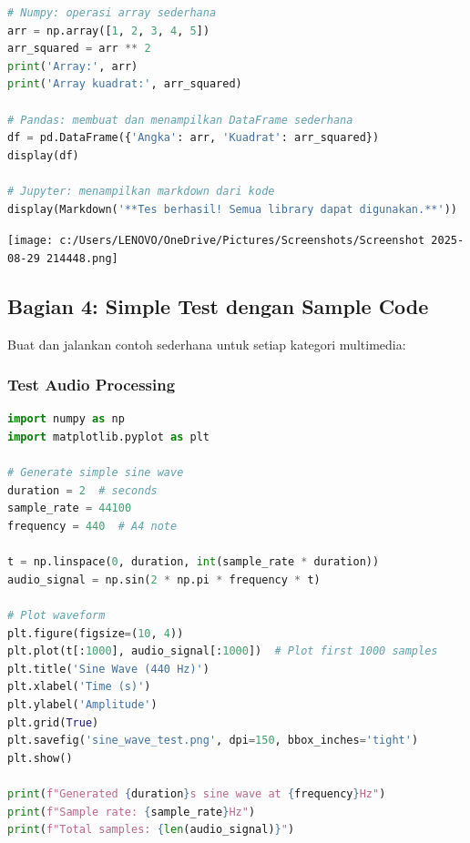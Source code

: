 \documentclass[11pt,a4paper]{article}
\begin{document}
\begin{itemize}
\begin{lstlisting}[language=Python, caption={General Purpose Test dengan numpy, pandas, dan jupyter}]
# Numpy: operasi array sederhana
arr = np.array([1, 2, 3, 4, 5])
arr_squared = arr ** 2
print('Array:', arr)
print('Array kuadrat:', arr_squared)

# Pandas: membuat dan menampilkan DataFrame sederhana
df = pd.DataFrame({'Angka': arr, 'Kuadrat': arr_squared})
display(df)

# Jupyter: menampilkan markdown dari kode
display(Markdown('**Tes berhasil! Semua library dapat digunakan.**'))
        \end{lstlisting}
        \begin{flushleft}
            \texttt{[image: c:/Users/LENOVO/OneDrive/Pictures/Screenshots/Screenshot 2025-08-29 214448.png]}
        \end{flushleft}
\end{itemize}

\subsection{Bagian 4: Simple Test dengan Sample Code}
Buat dan jalankan contoh sederhana untuk setiap kategori multimedia:

\subsubsection{Test Audio Processing}
\begin{lstlisting}[language=Python, caption=Test audio processing sederhana]
import numpy as np
import matplotlib.pyplot as plt

# Generate simple sine wave
duration = 2  # seconds
sample_rate = 44100
frequency = 440  # A4 note

t = np.linspace(0, duration, int(sample_rate * duration))
audio_signal = np.sin(2 * np.pi * frequency * t)

# Plot waveform
plt.figure(figsize=(10, 4))
plt.plot(t[:1000], audio_signal[:1000])  # Plot first 1000 samples
plt.title('Sine Wave (440 Hz)')
plt.xlabel('Time (s)')
plt.ylabel('Amplitude')
plt.grid(True)
plt.savefig('sine_wave_test.png', dpi=150, bbox_inches='tight')
plt.show()

print(f"Generated {duration}s sine wave at {frequency}Hz")
print(f"Sample rate: {sample_rate}Hz")
print(f"Total samples: {len(audio_signal)}")
\end{lstlisting}
\end{document}
